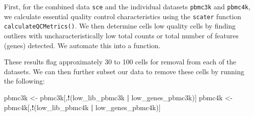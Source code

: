 \documentclass[]{book}
\newenvironment{Shaded}{\begin{snugshade}}{\end{snugshade}}
\newcommand{\CommentTok}[1]{\textcolor[rgb]{0.56,0.35,0.01}{\textit{#1}}}
\newcommand{\DataTypeTok}[1]{\textcolor[rgb]{0.13,0.29,0.53}{#1}}
\newcommand{\DecValTok}[1]{\textcolor[rgb]{0.00,0.00,0.81}{#1}}
\newcommand{\KeywordTok}[1]{\textcolor[rgb]{0.13,0.29,0.53}{\textbf{#1}}}
\newcommand{\NormalTok}[1]{#1}
\newcommand{\OperatorTok}[1]{\textcolor[rgb]{0.81,0.36,0.00}{\textbf{#1}}}
\newcommand{\StringTok}[1]{\textcolor[rgb]{0.31,0.60,0.02}{#1}}
\begin{document}
First, for the combined data \texttt{sce} and the individual datasets \texttt{pbmc3k} and \texttt{pbmc4k}, we calculate essential quality control characteristics using the \texttt{scater} function \texttt{calculateQCMetrics()}. We then determine cells low quality cells by finding outliers with uncharacteristically low total counts or total number of features (genes) detected. We automate this into a function.

\begin{Shaded}
\end{Shaded}

These results flag approximately 30 to 100 cells for removal from each of the datasets. We can then further subset our data to remove these cells by running the following:

\begin{Shaded}
\begin{Highlighting}[]
\NormalTok{pbmc3k <-}\StringTok{ }\NormalTok{pbmc3k[,}\OperatorTok{!}\NormalTok{(low_lib_pbmc3k }\OperatorTok{|}\StringTok{ }\NormalTok{low_genes_pbmc3k)]}
\NormalTok{pbmc4k <-}\StringTok{ }\NormalTok{pbmc4k[,}\OperatorTok{!}\NormalTok{(low_lib_pbmc4k }\OperatorTok{|}\StringTok{ }\NormalTok{low_genes_pbmc4k)]}
\end{Highlighting}
\end{Shaded}
\end{document}
